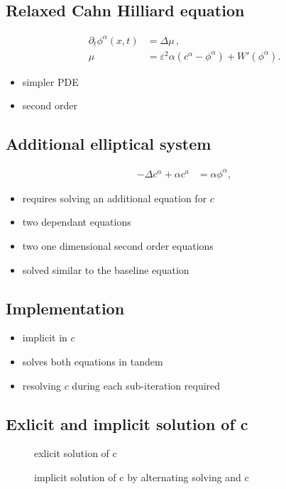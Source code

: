 \documentclass[11pt]{article}
\begin{document}
\subsection*{Relaxed Cahn Hilliard equation}
\label{sec:orge441d95}
\begin{equation}
\label{eq:relaxed-cahn-hilliard}
\begin{aligned}
\partial_t \phi^\alpha(x,t)  &= \Delta \mu \,,\\
\mu &= \varepsilon ^2 \alpha(c^\alpha - \phi^\alpha) + W'(\phi^{\alpha}) .
\end{aligned}
\end{equation}
\begin{itemize}
\item simpler PDE
\item second order
\end{itemize}
\subsection*{Additional elliptical system}
\label{sec:orge10da20}
\begin{align}
\label{eq:elliptical-equation}
- \Delta c^\alpha  + \alpha c^a &= \alpha \phi ^\alpha,
\end{align}
\begin{itemize}
\item requires solving an additional equation for \(c\)
\item two dependant equations
\item two one dimensional second order equations
\item solved similar to the baseline equation
\end{itemize}
\subsection*{Implementation}
\label{sec:orgf602ff2}
\begin{itemize}
\item implicit in \(c\)
\item solves both equations in tandem
\item resolving \(c\) during each sub-iteration required
\end{itemize}
\subsection*{Exlicit and implicit solution of c}
\label{sec:org8066d72}
\begin{figure}[htbp]
\centering

\caption{\label{fig:relaxed-smooth-eval}exlicit solution of c}
\end{figure}
\begin{figure}[htbp]
\centering

\caption{\label{fig:alternating-elips-smooth}implicit solution of c by alternating solving \phhi and c}
\end{figure}
\end{document}
